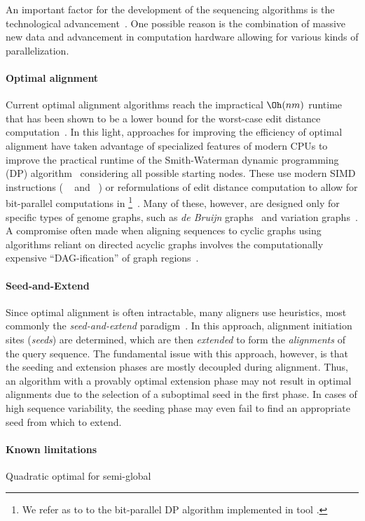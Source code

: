 An important factor for the development of the sequencing algorithms is the
technological advancement~\cite{alser2021technology}. One possible reason is the
combination of massive new data and advancement in computation hardware allowing
for various kinds of parallelization.


\paragraph{Optimal alignment}
Current optimal alignment algorithms reach the impractical $\Oh(nm)$ runtime
that has been shown to be a lower bound for the worst-case edit distance
computation~\cite{backurs2015edit}. In this light, approaches for improving the
efficiency of optimal alignment have taken advantage of specialized features of
modern CPUs to improve the practical runtime of the Smith-Waterman dynamic
programming (DP) algorithm~\cite{smith_comparison_1981} considering all possible
starting nodes. These use modern SIMD instructions (\eg
\vg~\cite{garrison_variation_2018} and \pasgal~\cite{jain_accelerating_2019}) or
reformulations of edit distance computation to allow for bit-parallel
computations in \graphaligner \footnote{We refer as \bitparallel to to the
bit-parallel DP algorithm implemented in \graphaligner tool
\cite{rautiainen_bitparallel_2019}.}~\cite{rautiainen_bitparallel_2019}. Many of
these, however, are designed only for specific types of genome graphs, such as
{\itshape de Bruijn}
graphs~\cite{liu_debga_2016,limasset2019toward} and
variation graphs~\cite{garrison_variation_2018}. A compromise often made when
aligning sequences to cyclic graphs using algorithms reliant on directed acyclic
graphs involves the computationally expensive ``DAG-ification'' of graph
regions~\cite{kavya_sequence_2019,garrison_variation_2018}.

\paragraph{Seed-and-Extend}
Since optimal alignment is often intractable, many aligners use heuristics, most
commonly the \emph{seed-and-extend}
paradigm~\cite{altschul_basic_1990,langmead_fast_2012,li_fast_2009}. In this
approach, alignment initiation sites (\emph{seeds}) are determined, which are
then \emph{extended} to form the \emph{alignments} of the query sequence. The
fundamental issue with this approach, however, is that the seeding and extension
phases are mostly decoupled during alignment. Thus, an algorithm with a provably
optimal extension phase may not result in optimal alignments due to the
selection of a suboptimal seed in the first phase. In cases of high sequence
variability, the seeding phase may even fail to find an appropriate seed from
which to extend.

\paragraph{Known limitations}

Quadratic optimal for semi-global